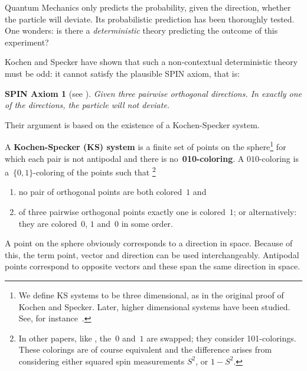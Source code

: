 \documentclass{report}
\newcommand{\keyword}[1]{\textbf{#1}}
\begin{document}
Quantum Mechanics only predicts the probability, given the direction,
whether the particle will deviate.
Its probabilistic prediction has been thoroughly tested.
One wonders: is there a
\emph{deterministic} theory predicting the
outcome of this experiment?

Kochen and Specker have shown that such a non-contextual deterministic
theory must be odd: it cannot satisfy the plausible SPIN
axiom, that is:

\begingroup\makeatletter{}
\newtheorem{spin}{SPIN Axiom}
\begin{spin}[see \cite{ck09}]
    Given three pairwise orthogonal directions.
    In exactly one of the directions, the particle will not deviate.
\end{spin}
\def\@thmcounter#1{\noexpand\arabic{#1}}\makeatother\endgroup

Their argument is based on the existence of a Kochen-Specker system.
\begin{definition}
    A \keyword{Kochen-Specker (KS) system} is
    a finite set of points on the sphere\footnote{
            We define KS systems to be three dimensional,
            as in the original proof of Kochen and Specker.
            Later, higher dimensional systems have been studied.
            See, for instance~\cite[p.~201]{qtcm}.
        }
    for which each pair is not antipodal and
    there is no~\keyword{010-coloring}.
    A $010$-coloring is a~$\{0,1\}$-coloring of the points such that%
        \footnote{
                In other papers, like \cite{aow11},
                the~$0$ and~$1$ are swapped; they consider 101-colorings.
                These colorings are of course equivalent and the
                difference arises from considering either squared
                spin measurements $S^2$, or $1-S^2$.
               	}
    \begin{enumerate}
        \item
            no pair of orthogonal points are both colored~$1$ and
        \item
            of three pairwise orthogonal points exactly one is colored~$1$;
            or alternatively: they are colored~$0$, $1$ and~$0$ in some order.
    \end{enumerate}
\end{definition}
A point on the sphere obviously corresponds to a direction in space.
Because of this, the term point, vector and direction
can be used interchangeably. Antipodal points correspond to opposite
vectors and these span the same direction in space.
\end{document}
